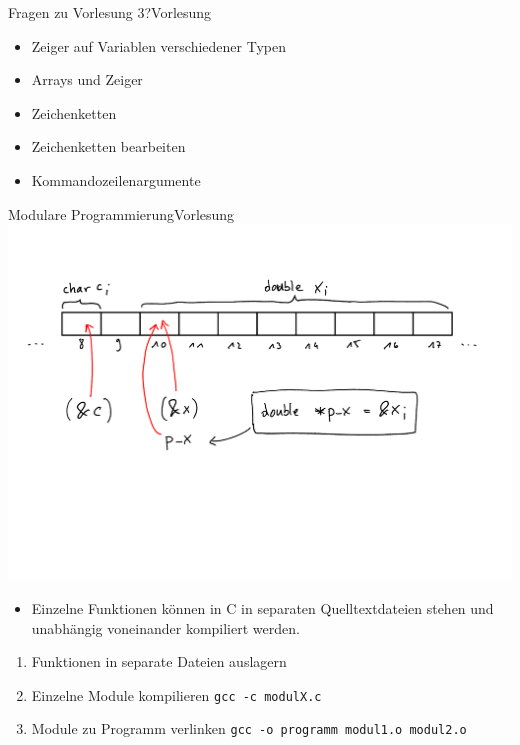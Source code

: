 \documentclass[xcolor=dvipsnames]{beamer}
\newcounter{lecturecounter}
\begin{document}

\begin{frame}[fragile]{Fragen zu Vorlesung 3?}{Vorlesung }
  \begin{itemize}
    \item{Zeiger auf Variablen verschiedener Typen}
    \item{Arrays und Zeiger}
    \item{Zeichenketten}
    \item{Zeichenketten bearbeiten}
    \item{Kommandozeilenargumente}
  \end{itemize}
\end{frame}

\begin{frame}[fragile]{Modulare Programmierung}{Vorlesung }
\includegraphics[width=\textwidth,page=2,trim=0 10cm 0 2cm,clip=true]{graphics/c_kurs_tafel}
\begin{block}{}
  \begin{itemize}
    \item{Einzelne Funktionen können in C in separaten Quelltextdateien stehen und unabhängig voneinander kompiliert werden.}
  \end{itemize}
\begin{enumerate}
  \item{Funktionen in separate Dateien auslagern}
  \item{Einzelne Module kompilieren \texttt{gcc -c modulX.c}}
  \item{Module zu Programm verlinken \texttt{gcc -o programm modul1.o modul2.o}}
\end{enumerate}
\end{block}
\end{frame}
\end{document}
